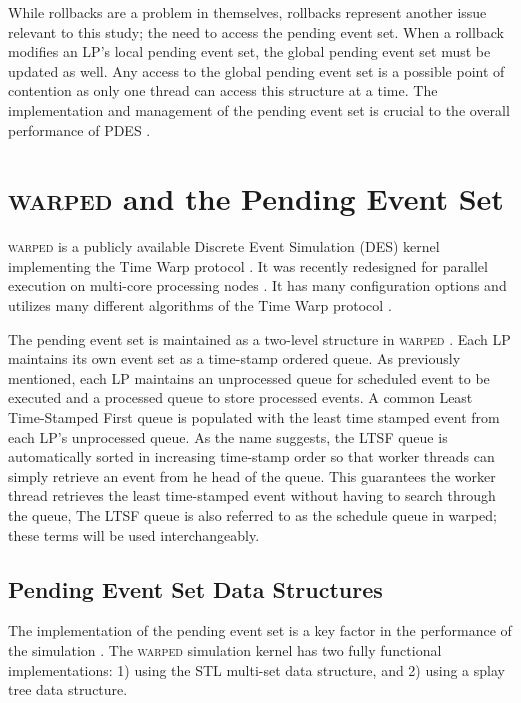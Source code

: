 \documentclass[11pt]{book}
\begin{document}
While rollbacks are a problem in themselves, rollbacks represent another issue relevant to
this study; the need to access the pending event set.  When a rollback modifies an LP's
local pending event set, the global pending event set must be updated as well.  Any access
to the global pending event set is a possible point of contention as only one thread can
access this structure at a time.  The implementation and management of the pending event
set is crucial to the overall performance of PDES \cite{twpes}.

\section{\textsc{warped} and the Pending Event Set}

\textsc{warped} is a publicly available Discrete Event Simulation (DES) kernel implementing the
Time Warp protocol \cite{martin,fujimoto}.  It was recently redesigned for parallel
execution on multi-core processing nodes \cite{muthalagu}.  It has many configuration
options and utilizes many different algorithms of the Time Warp protocol \cite{fujimoto}.

The pending event set is maintained as a two-level structure in \textsc{warped} \cite{dickman}.
Each LP maintains its own event set as a time-stamp ordered queue.  As previously
mentioned, each LP maintains an unprocessed queue for scheduled event to be executed and a
processed queue to store processed events.  A common Least Time-Stamped First queue is
populated with the least time stamped event from each LP's unprocessed queue.  As the name
suggests, the LTSF queue is automatically sorted in increasing time-stamp order so that
worker threads can simply retrieve an event from he head of the queue.  This guarantees
the worker thread retrieves the least time-stamped event without having to search through
the queue, The LTSF queue is also referred to as the schedule queue in warped; these terms
will be used interchangeably.

\subsection{Pending Event Set Data Structures}

The implementation of the pending event set is a key factor in the performance of the
simulation \cite{twpes}.  The \textsc{warped} simulation kernel has two fully functional
implementations: 1) using the STL multi-set data structure, and 2) using a splay tree data
structure.
\end{document}
